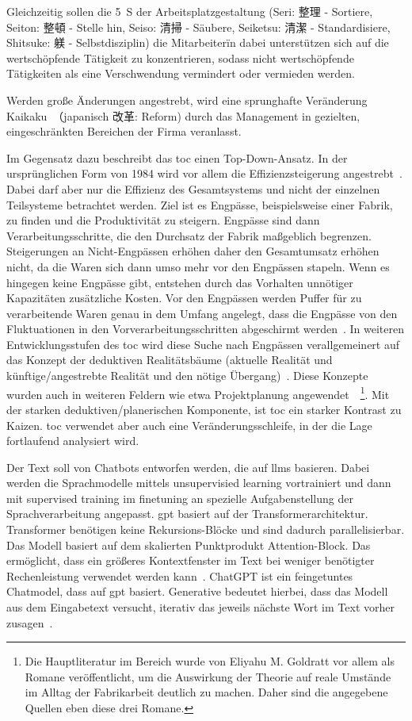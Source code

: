 \documentclass[acmengage,authorversion,nonacm]{acmart}
\begin{document}
Gleichzeitig sollen die 5~S der Arbeitsplatzgestaltung (Seri: 整理 - Sortiere, Seiton: 整頓 - Stelle hin, Seiso: 清掃 - Säubere, Seiketsu: 清潔 - Standardisiere, Shitsuke:  躾 - Selbstdisziplin) die Mitarbeiterïn dabei unterstützen sich auf die wertschöpfende Tätigkeit zu konzentrieren, sodass nicht wertschöpfende Tätigkeiten als eine Verschwendung vermindert oder vermieden werden.

Werden große Änderungen angestrebt, wird eine sprunghafte Veränderung Kaikaku~（japanisch 改革: Reform) durch das Management in gezielten, eingeschränkten Bereichen der Firma veranlasst.

Im Gegensatz dazu beschreibt das \gls{toc} einen Top-Down-Ansatz. In der ursprünglichen Form von 1984 wird vor allem die Effizienzsteigerung angestrebt~\cite{goldratt_its_2011}. Dabei darf aber nur die Effizienz des Gesamtsystems und nicht der einzelnen Teilsysteme betrachtet werden. Ziel ist es Engpässe, beispielsweise einer Fabrik, zu finden und die Produktivität zu steigern. Engpässe sind dann Verarbeitungsschritte, die den Durchsatz der Fabrik maßgeblich begrenzen. Steigerungen an Nicht-Engpässen erhöhen daher den Gesamtumsatz erhöhen nicht, da die Waren sich dann umso mehr vor den Engpässen stapeln. Wenn es hingegen keine Engpässe gibt, entstehen durch das Vorhalten unnötiger Kapazitäten zusätzliche Kosten. Vor den Engpässen werden Puffer für zu verarbeitende Waren genau in dem Umfang angelegt, dass die Engpässe von den Fluktuationen in den Vorverarbeitungsschritten abgeschirmt werden~\cite{goldratt_goal_2012}. In weiteren Entwicklungsstufen des \gls{toc} wird diese Suche nach Engpässen verallgemeinert auf das Konzept der deduktiven Realitätsbäume (aktuelle Realität und künftige/angestrebte Realität und den nötige Übergang)~\cite{goldratt_its_2011}. Diese Konzepte wurden auch in weiteren Feldern wie etwa Projektplanung angewendet~\cite{goldratt_critical_2002}~\footnote{Die Hauptliteratur im Bereich wurde von Eliyahu M. Goldratt vor allem als Romane veröffentlicht, um die Auswirkung der Theorie auf reale Umstände im Alltag der Fabrikarbeit deutlich zu machen. Daher sind die angegebene Quellen eben diese drei Romane.}. Mit der starken deduktiven/planerischen Komponente, ist \gls{toc} ein starker Kontrast zu Kaizen. \gls{toc} verwendet aber auch eine Veränderungsschleife, in der die Lage fortlaufend analysiert wird.

Der Text soll von Chatbots entworfen werden, die auf \glspl{llm} basieren.
Dabei werden die Sprachmodelle mittels unsupervisied learning vortrainiert und dann mit supervised training im finetuning an spezielle Aufgabenstellung der Sprachverarbeitung angepasst. \gls{gpt} basiert auf der Transformerarchitektur. Transformer benötigen keine Rekursions-Blöcke und sind dadurch parallelisierbar. Das Modell basiert auf dem skalierten Punktprodukt Attention-Block. Das ermöglicht, dass ein größeres Kontextfenster im Text bei weniger benötigter Rechenleistung verwendet werden kann~\cite{vaswani_attention_2023}. ChatGPT ist ein feingetuntes Chatmodel, dass auf \gls{gpt} basiert.
Generative bedeutet hierbei, dass das Modell aus dem Eingabetext versucht, iterativ das jeweils nächste Wort im Text vorher zusagen~\cite{raschka_build_2025}.
\end{document}
